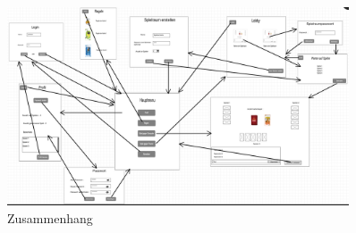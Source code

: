 \begin{figure}
	\centering
	\includegraphics[width=0.9\textwidth]{img/Zusammenhang}
	\caption{Zusammenhang}
	\label{gui:zusammenhang}
\end{figure}